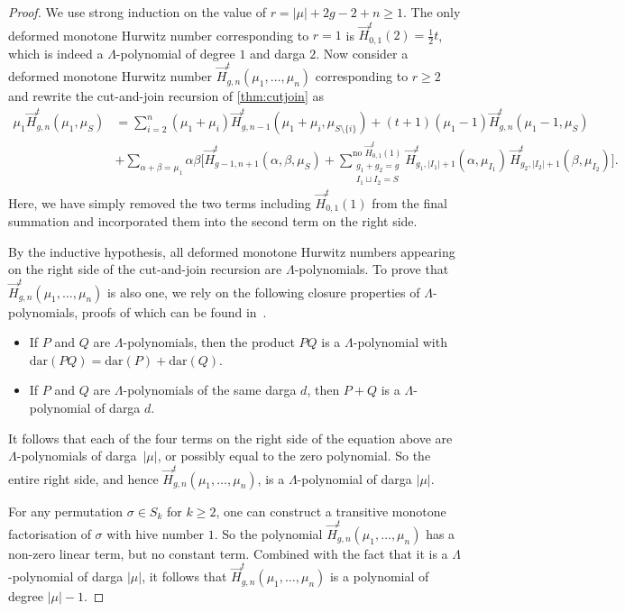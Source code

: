 \documentclass[a4paper]{article}
\theoremstyle{plain}
\numberwithin{theorem}{section}
\theoremstyle{definition}
\theoremstyle{remark}
\renewcommand{\geq}{\geqslant}
\newcommand{\HN}[3]{\vec{H}^t_{#1,#2}(#3)}
\begin{document}
\begin{proof} 
We use strong induction on the value of $r = |\mu| + 2g - 2 + n \geq 1$. The only deformed monotone Hurwitz number corresponding to $r = 1$ is $\HN{0}{1}{2} = \frac{1}{2} t$, which is indeed a $\Lambda$-polynomial of degree $1$ and darga $2$. Now consider a deformed monotone Hurwitz number $\HN{g}{n}{\mu_1, \ldots, \mu_n}$ corresponding to $r \geq 2$ and rewrite the cut-and-join recursion of \cref{thm:cutjoin} as
\begin{align*}
\mu_1 \HN{g}{n}{\mu_1, \mu_S} &= \sum_{i=2}^n (\mu_1 + \mu_i) \HN{g}{n-1}{\mu_1 + \mu_i, \mu_{S \setminus\{i\}}} + (t + 1) (\mu_1-1) \HN{g}{n}{\mu_1-1, \mu_S} \nonumber \\
&+ \sum_{\alpha+\beta=\mu_1} \alpha \beta \Bigg[ \HN{g-1}{n+1}{\alpha, \beta, \mu_S} + \sum_{\substack{g_1+g_2 = g \\ I_1 \sqcup I_2= S}}^{\text{no } \HN{0}{1}{1}} \HN{g_1}{|I_1|+1}{\alpha, \mu_{I_1}} \, \HN{g_2}{|I_2|+1}{\beta, \mu_{I_2}} \Bigg].
\end{align*}
Here, we have simply removed the two terms including $\HN{0}{1}{1}$ from the final summation and incorporated them into the second term on the right side.


By the inductive hypothesis, all deformed monotone Hurwitz numbers appearing on the right side of the cut-and-join recursion are $\Lambda$-polynomials. To prove that $\HN{g}{n}{\mu_1, \ldots, \mu_n}$ is also one, we rely on the following closure properties of $\Lambda$-polynomials, proofs of which can be found in~\cite{sun-wan-zha15}.
\begin{itemize}
\item If $P$ and $Q$ are $\Lambda$-polynomials, then the product $PQ$ is a $\Lambda$-polynomial with $\mathrm{dar}(PQ) = \mathrm{dar}(P) + \mathrm{dar}(Q)$.
\item If $P$ and $Q$ are $\Lambda$-polynomials of the same darga $d$, then $P + Q$ is a $\Lambda$-polynomial of darga $d$.
\end{itemize}
It follows that each of the four terms on the right side of the equation above are $\Lambda$-polynomials of darga~$|\mu|$, or possibly equal to the zero polynomial. So the entire right side, and hence $\HN{g}{n}{\mu_1, \ldots, \mu_n}$, is a $\Lambda$-polynomial of darga $|\mu|$.


For any permutation $\sigma \in S_k$ for $k \geq 2$, one can construct a transitive monotone factorisation of $\sigma$ with hive number $1$. So the polynomial $\HN{g}{n}{\mu_1, \ldots, \mu_n}$ has a non-zero linear term, but no constant term. Combined with the fact that it is a $\Lambda$-polynomial of darga $|\mu|$, it follows that $\HN{g}{n}{\mu_1, \ldots, \mu_n}$ is a polynomial of degree $|\mu|-1$.
\end{proof}
\end{document}
